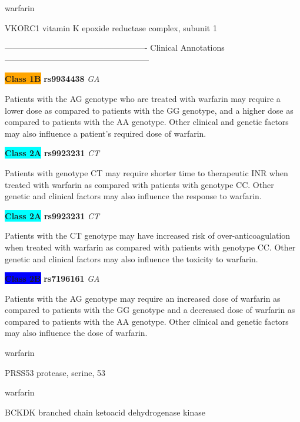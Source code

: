 \documentclass{resume} %
\begin{document}
\begin{rSection}{ warfarin }
\begin{rSubsection}{ VKORC1 }{ vitamin K epoxide reductase complex, subunit 1 }{}{}
\item[] ---------------------------------------------------- Clinical Annotations -----------------------------------------------------\newline
\item \textbf{\colorbox{orange} {Class 1B}} \textbf{ rs9934438 } \textit{ GA }
\item[] Patients with the AG genotype who are treated with warfarin may require a lower dose as compared to patients with the GG genotype, and a higher dose as compared to patients with the AA genotype. Other clinical and genetic factors may also influence a patient’s required dose of warfarin. \item \textbf{\colorbox{cyan} {Class 2A}} \textbf{ rs9923231 } \textit{ CT }
\item[] Patients with genotype CT may require shorter time to therapeutic INR when treated with warfarin as compared with patients with genotype CC. Other genetic and clinical factors may also influence the response to warfarin. \item \textbf{\colorbox{cyan} {Class 2A}} \textbf{ rs9923231 } \textit{ CT }
\item[] Patients with the CT genotype may have increased risk of over-anticoagulation when treated with warfarin as compared with patients with genotype CC. Other genetic and clinical factors may also influence the toxicity to warfarin.\item \textbf{\colorbox{blue} {Class 2B}} \textbf{ rs7196161 } \textit{ GA }
\item[] Patients with the AG genotype may require an increased dose of warfarin as compared to patients with the GG genotype and a decreased dose of warfarin as compared to patients with the AA genotype. Other clinical and genetic factors may also influence the dose of warfarin. 

\end{rSubsection}

\end{rSection}\begin{rSection}{ warfarin }
\item[]
\begin{rSubsection}{ PRSS53 }{ protease, serine, 53 }{}{}
\item[]


\end{rSubsection}

\end{rSection}\begin{rSection}{ warfarin }
\item[]
\begin{rSubsection}{ BCKDK }{ branched chain ketoacid dehydrogenase kinase }{}{}
\item[]


\end{rSubsection}

\end{rSection}
\end{document}
